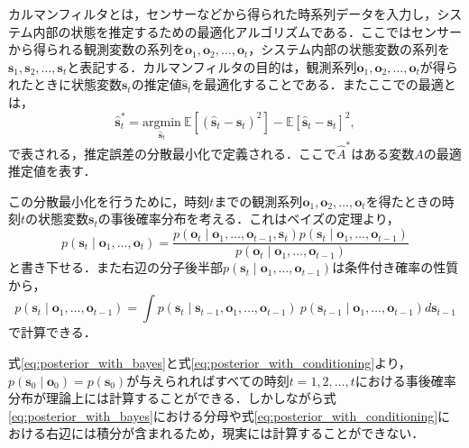         カルマンフィルタ\cite{bishop2001introduction}とは，センサーなどから得られた時系列データを入力し，システム内部の状態を推定するための最適化アルゴリズムである．ここではセンサーから得られる観測変数の系列を$\bm{o}_1, \bm{o}_2, \dots, \bm{o}_t$，システム内部の状態変数の系列を$\bm{s}_1, \bm{s}_2, \dots, \bm{s}_t$と表記する．カルマンフィルタの目的は，観測系列$\bm{o}_1, \bm{o}_2, \dots, \bm{o}_t$が得られたときに状態変数$\bm{s}_t$の推定値$\hat{\bm{s}}_t$を最適化することである．またここでの最適とは，
        \begin{equation}
            \label{eq:kalman_optimality}
            \hat{\bm{s}}_t^* = \underset{\hat{\bm{s}}_t}{\text{argmin}} ~ \mathbb{E}\left[\left(\hat{\bm{s}}_t - \bm{s}_t\right)^2\right] - \mathbb{E}\left[\hat{\bm{s}}_t - \bm{s}_t\right]^2,
        \end{equation}
        で表される，推定誤差の分散最小化で定義される．ここで$\hat{A}^*$はある変数$A$の最適推定値を表す．

        この分散最小化を行うために，時刻$t$までの観測系列$\bm{o}_1, \bm{o}_2, \dots, \bm{o}_t$を得たときの時刻$t$の状態変数$\bm{s}_t$の事後確率分布を考える．これはベイズの定理より，
        \begin{equation}
            \label{eq:posterior_with_bayes}
            p(\bm{s}_t \mid \bm{o}_1,\dots, \bm{o}_t ) = \frac{p(\bm{o}_t \mid \bm{o}_1,\dots, \bm{o}_{t-1}, \bm{s}_t) p(\bm{s}_t \mid \bm{o}_1,\dots, \bm{o}_{t-1})}{p(\bm{o}_t \mid \bm{o}_1,\dots, \bm{o}_{t-1})}
        \end{equation}
        と書き下せる．また右辺の分子後半部$p(\bm{s}_t \mid \bm{o}_1,\dots, \bm{o}_{t-1})$は条件付き確率の性質から，
        \begin{equation}
            \label{eq:posterior_with_conditioning}
            p(\bm{s}_t \mid \bm{o}_1,\dots, \bm{o}_{t-1}) = \int p(\bm{s}_t \mid \bm{s}_{t-1}, \bm{o}_1, \dots, \bm{o}_{t-1}) ~ p(\bm{s}_{t-1} \mid \bm{o}_1, \dots, \bm{o}_{t-1}) d\bm{s}_{t-1}
        \end{equation}
        で計算できる．

        式\ref{eq:posterior_with_bayes}と式\ref{eq:posterior_with_conditioning}より，$p(\bm{s}_0 \mid \bm{o}_0) = p(\bm{s}_0)$が与えられればすべての時刻$t = 1, 2, \dots, t$における事後確率分布が理論上には計算することができる．しかしながら式\ref{eq:posterior_with_bayes}における分母や式\ref{eq:posterior_with_conditioning}における右辺には積分が含まれるため，現実には計算することができない．


